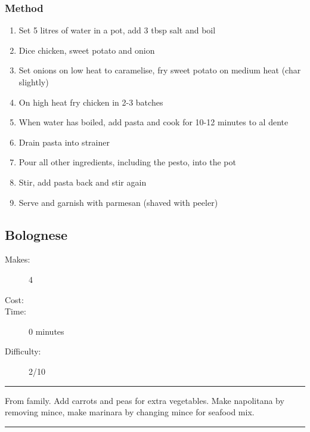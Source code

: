 \documentclass[]{article}
\begin{document}
\subsubsection*{\Large Method}
\begin{enumerate}[font=\huge\color{accent}]
	\item Set 5 litres of water in a pot, add 3 tbsp salt and boil
	\item Dice chicken, sweet potato and onion
	\item Set onions on low heat to caramelise, fry sweet potato on medium heat (char slightly)
	\item On high heat fry chicken in 2-3 batches
	\item When water has boiled, add pasta and cook for 10-12 minutes to al dente
	\item Drain pasta into strainer
	\item Pour all other ingredients, including the pesto, into the pot
	\item Stir, add pasta back and stir again
	\item Serve and garnish with parmesan (shaved with peeler)
\end{enumerate}
\newpage
{}\label{rec:Bolognese}
\subsection*{\center\huge Bolognese}
\begin{description}
\item[Makes:] 4 
\item[Cost:] \textdollar
\item[Time:] 0 minutes
\item[Difficulty:] 2/10
\end{description}
\vspace{0.2cm}\hrule\vspace{0.5cm}
\begin{adjustwidth}{0.5 cm}{0.5 cm}

From family. Add carrots and peas for extra vegetables. Make napolitana by removing mince, make marinara by changing mince for seafood mix. \hfill\color{accent}{\Large\faTruck\hspace{0.1cm}}\color{black}

\end{adjustwidth}
\vspace{0.5cm}\hrule
\end{document}
